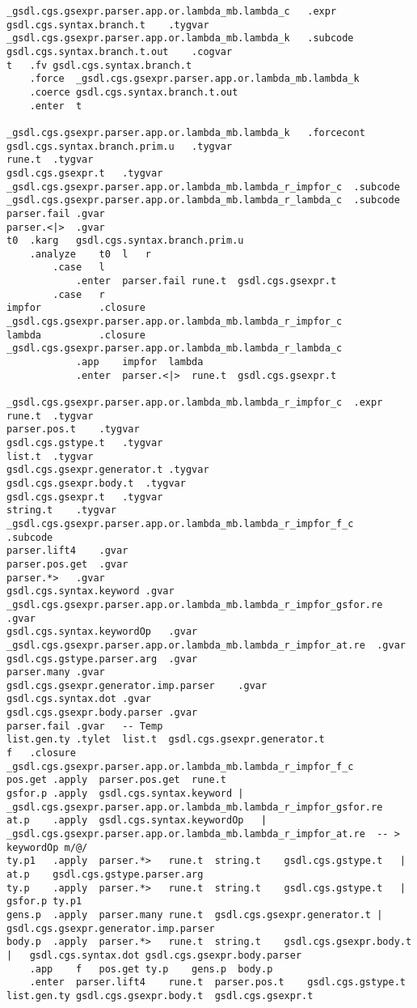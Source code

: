 \documentclass{report}
\begin{document}
\begin{verbatim}
_gsdl.cgs.gsexpr.parser.app.or.lambda_mb.lambda_c	.expr
gsdl.cgs.syntax.branch.t	.tygvar
_gsdl.cgs.gsexpr.parser.app.or.lambda_mb.lambda_k	.subcode
gsdl.cgs.syntax.branch.t.out	.cogvar
t	.fv	gsdl.cgs.syntax.branch.t
	.force	_gsdl.cgs.gsexpr.parser.app.or.lambda_mb.lambda_k
	.coerce	gsdl.cgs.syntax.branch.t.out
	.enter	t

_gsdl.cgs.gsexpr.parser.app.or.lambda_mb.lambda_k	.forcecont
gsdl.cgs.syntax.branch.prim.u	.tygvar
rune.t	.tygvar
gsdl.cgs.gsexpr.t	.tygvar
_gsdl.cgs.gsexpr.parser.app.or.lambda_mb.lambda_r_impfor_c	.subcode
_gsdl.cgs.gsexpr.parser.app.or.lambda_mb.lambda_r_lambda_c	.subcode
parser.fail	.gvar
parser.<|>	.gvar
t0	.karg	gsdl.cgs.syntax.branch.prim.u
	.analyze	t0	l	r
		.case	l
			.enter	parser.fail	rune.t	gsdl.cgs.gsexpr.t
		.case	r
impfor			.closure	_gsdl.cgs.gsexpr.parser.app.or.lambda_mb.lambda_r_impfor_c
lambda			.closure	_gsdl.cgs.gsexpr.parser.app.or.lambda_mb.lambda_r_lambda_c
			.app	impfor	lambda
			.enter	parser.<|>	rune.t	gsdl.cgs.gsexpr.t

_gsdl.cgs.gsexpr.parser.app.or.lambda_mb.lambda_r_impfor_c	.expr
rune.t	.tygvar
parser.pos.t	.tygvar
gsdl.cgs.gstype.t	.tygvar
list.t	.tygvar
gsdl.cgs.gsexpr.generator.t	.tygvar
gsdl.cgs.gsexpr.body.t	.tygvar
gsdl.cgs.gsexpr.t	.tygvar
string.t	.tygvar
_gsdl.cgs.gsexpr.parser.app.or.lambda_mb.lambda_r_impfor_f_c	.subcode
parser.lift4	.gvar
parser.pos.get	.gvar
parser.*>	.gvar
gsdl.cgs.syntax.keyword	.gvar
_gsdl.cgs.gsexpr.parser.app.or.lambda_mb.lambda_r_impfor_gsfor.re	.gvar
gsdl.cgs.syntax.keywordOp	.gvar
_gsdl.cgs.gsexpr.parser.app.or.lambda_mb.lambda_r_impfor_at.re	.gvar
gsdl.cgs.gstype.parser.arg	.gvar
parser.many	.gvar
gsdl.cgs.gsexpr.generator.imp.parser	.gvar
gsdl.cgs.syntax.dot	.gvar
gsdl.cgs.gsexpr.body.parser	.gvar
parser.fail	.gvar	-- Temp
list.gen.ty	.tylet	list.t	gsdl.cgs.gsexpr.generator.t
f	.closure	_gsdl.cgs.gsexpr.parser.app.or.lambda_mb.lambda_r_impfor_f_c
pos.get	.apply	parser.pos.get	rune.t
gsfor.p	.apply	gsdl.cgs.syntax.keyword	|	_gsdl.cgs.gsexpr.parser.app.or.lambda_mb.lambda_r_impfor_gsfor.re
at.p	.apply	gsdl.cgs.syntax.keywordOp	|	_gsdl.cgs.gsexpr.parser.app.or.lambda_mb.lambda_r_impfor_at.re	-- > keywordOp m/@/
ty.p1	.apply	parser.*>	rune.t	string.t	gsdl.cgs.gstype.t	|	at.p	gsdl.cgs.gstype.parser.arg
ty.p	.apply	parser.*>	rune.t	string.t	gsdl.cgs.gstype.t	|	gsfor.p	ty.p1
gens.p	.apply	parser.many	rune.t	gsdl.cgs.gsexpr.generator.t	|	gsdl.cgs.gsexpr.generator.imp.parser
body.p	.apply	parser.*>	rune.t	string.t	gsdl.cgs.gsexpr.body.t	|	gsdl.cgs.syntax.dot	gsdl.cgs.gsexpr.body.parser
	.app	f	pos.get	ty.p	gens.p	body.p
	.enter	parser.lift4	rune.t	parser.pos.t	gsdl.cgs.gstype.t	list.gen.ty	gsdl.cgs.gsexpr.body.t	gsdl.cgs.gsexpr.t


\end{verbatim}
\end{document}
